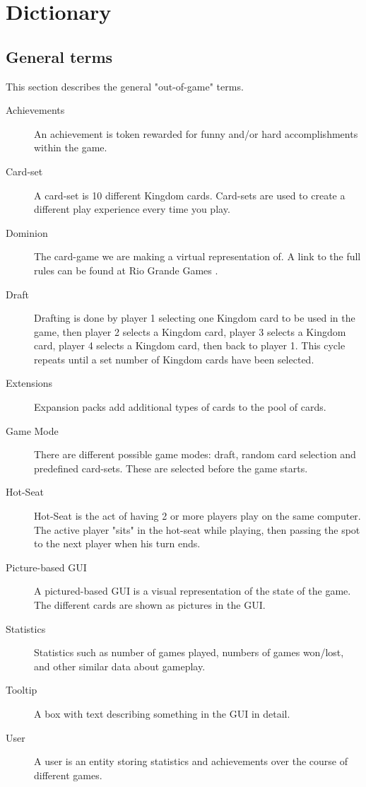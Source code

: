 \section{Dictionary}
\subsection{General terms}
This section describes the general "out-of-game" terms.
\begin{description}
\item[Achievements] An achievement is token rewarded for funny and/or hard accomplishments within the game.
\item[Card-set] A card-set is 10 different Kingdom cards. Card-sets are used to create a different play experience every time you play.
\item[Dominion] The card-game we are making a virtual representation of. A link to the full rules can be found at Rio Grande Games \cite{dominionRules}.
\item[Draft] Drafting is done by player 1 selecting one Kingdom card to be used in the game, then player 2 selects a Kingdom card, player 3 selects a Kingdom card, player 4 selects a Kingdom card, then back to player 1. This cycle repeats until a set number of Kingdom cards have been selected.
\item[Extensions] Expansion packs add additional types of cards to the pool of cards.
\item[Game Mode] There are different possible game modes: draft, random card selection and predefined card-sets. These are selected before the game starts.
\item[Hot-Seat] Hot-Seat is the act of having 2 or more players play on the same computer. The active player "sits" in the hot-seat while playing, then passing the spot to the next player when his turn ends.
\item[Picture-based GUI] A pictured-based GUI is a visual representation of the state of the game. The different cards are shown as pictures in the GUI.
\item[Statistics] Statistics such as number of games played, numbers of games won/lost, and other similar data about gameplay.
\item[Tooltip] A box with text describing something in the GUI in detail.
\item[User] A user is an entity storing statistics and achievements over the course of different games.
\end{description}
